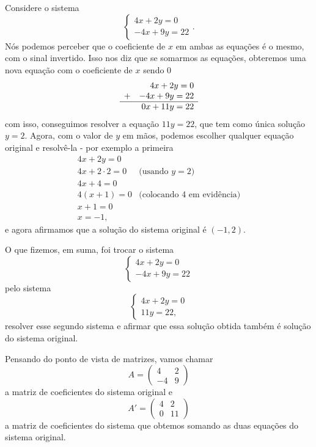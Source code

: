 \begin{ex}
	Considere o sistema
	\[\begin{cases}
	4x+2y=0\\
	-4x+9y=22
	\end{cases}.\] Nós podemos perceber que o coeficiente de $x$ em ambas as equações é o mesmo, com o sinal invertido. Isso nos diz que se somarmos as equações, obteremos uma nova equação com o coeficiente de $x$ sendo 0
	\[
	\begin{array}[b]{lr}
	&4x+2y=0\\
	+&-4x+9y=22\\
	\hline
	&0x+11y=22
	\end{array}
	\]com isso, conseguimos resolver a equação $11y=22$, que tem como única solução $y=2$. Agora, com o valor de $y$ em mãos, podemos escolher qualquer equação original e resolvê-la - por exemplo a primeira
	\[\begin{array}{rl}
		4x+2y=0&\\
		4x+2\cdot2=0 & \text{(usando }y=2\text{)}\\
		4x+4=0&\\
		4(x+1)=0 & \text{(colocando 4 em evidência)}\\
		x+1=0 &\\
		x=-1,
	\end{array}\] e agora afirmamos que a solução do sistema original é $(-1,2)$.
	
	O que fizemos, em suma, foi trocar o sistema
	\[\begin{cases}
	4x+2y=0\\
	-4x+9y=22
	\end{cases}\]pelo sistema
	\[
	\begin{cases}
	4x+2y=0\\
	11y=22,
	\end{cases}\]resolver esse segundo sistema e afirmar que essa solução obtida também é solução do sistema original.
	
	\tcblower
	
	Pensando do ponto de vista de matrizes, vamos chamar
	\[A=\begin{pmatrix}
	4 &2\\-4 &9
	\end{pmatrix}\]a matriz de coeficientes do sistema original e 
	\[A'=\begin{pmatrix}
	4 & 2\\ 0 & 11
	\end{pmatrix}\]a matriz de coeficientes do sistema que obtemos somando as duas equações do sistema original.
	

\end{ex}
